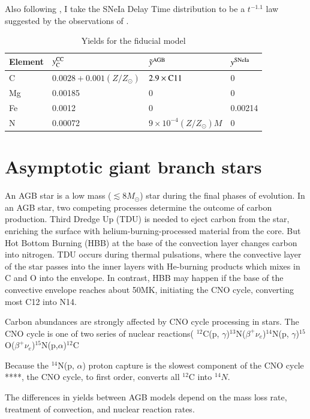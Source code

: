 \documentclass[12pt,oneside]{report}
\newcommand{\Ycc}{\ensuremath{y_{\rm C}^{\rm CC}}}
\newcommand{\sun}{\ensuremath{\odot}}
\begin{document}
Also following \citet{james+21, james+22}, I take the SNeIa Delay Time distribution to be a
$t^{-1.1}$ law suggested by the observations of \citet{maoz+12}.


\begin{table}
	\centering
    \caption[Fiducial Model]{Yields for the fiducial model}
	\label{tab:fiducial_mod}
	\begin{tabular}{l l l l}
		\hline
        Element & $\Ycc$ & $\tilde{y}^{\rm AGB}$ & $y^{\rm SNe Ia}$ \\
		\hline
        C & $0.0028 + 0.001(Z/Z_\odot)$ & $2.9\times{\rm C11}$ &  0 \\
        Mg & 0.00185 & 0 & 0 \\
        Fe & 0.0012 & 0 & 0.00214 \\
        N & 0.00072 & $9\times10^{-4}(Z/Z_\odot)M$ & 0\\
		\hline
	\end{tabular}
\end{table}

\section{Asymptotic giant branch stars}\label{sec:agb}


An AGB star is a low mass ($\lesssim 8 M_{\sun}$) star during the final phases of evolution.  In an AGB star, two competing processes determine the outcome of carbon production.
Third Dredge Up (TDU) is needed to eject carbon from the star, enriching the surface with helium-burning-processed material from the core. But Hot Bottom Burning (HBB) at the base of the convection layer changes carbon into nitrogen. 
TDU occurs during thermal pulsations, where the convective layer of the star passes into the inner layers with He-burning products which mixes in C and O into the envelope. In contrast, HBB may happen if the base of the convective envelope reaches about 50MK, initiating the CNO cycle, converting most C12 into N14. 

Carbon abundances are strongly affected by CNO cycle processing in stars. The CNO cycle is one of two series of nuclear reactions( $^{12}$C(p, $\gamma$)$^{13}$N($\beta^+ \nu_e$)$^{14}$N(p, $\gamma$)$^{15}$O($\beta^+\nu_e$)$^{15}$N(p,$\alpha$)$^{12}$C

Because the $^{14}$N(p, $\alpha$) proton capture is the slowest component of the CNO cycle ****, the CNO cycle, to first order, converts all $^{12}$C into $^{14}N$. 

The differences in yields between AGB models depend on the mass loss rate, treatment of convection, and nuclear reaction rates. 
\end{document}
